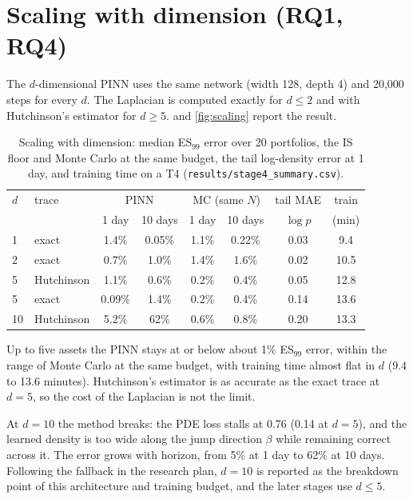 \section{Scaling with dimension (RQ1, RQ4)}
\label{sec:res-scaling}

The $d$-dimensional PINN uses the same network (width 128, depth 4) and 20{,}000 steps for every $d$. The
Laplacian is computed exactly for $d \le 2$ and with Hutchinson's estimator for $d \ge 5$.
 and \cref{fig:scaling} report the result.

\begin{table}[t]
  \centering
  \caption{Scaling with dimension: median ES$_{99}$ error over 20 portfolios, the IS floor and Monte Carlo
    at the same budget, the tail log-density error at 1 day, and training time on a T4
    (\texttt{results/stage4\_summary.csv}).}
  \label{tab:scaling}
  \begin{tabular}{llcccccc}
    \toprule
    $d$ & trace & \multicolumn{2}{c}{PINN} & \multicolumn{2}{c}{MC (same $N$)} & tail MAE & train \\
        &       & 1 day & 10 days & 1 day & 10 days & $\log p$ & (min) \\
    \midrule
    1  & exact      & 1.4\% & 0.05\% & 1.1\% & 0.22\% & 0.03 & 9.4 \\
    2  & exact      & 0.7\% & 1.0\%  & 1.4\% & 1.6\%  & 0.02 & 10.5 \\
    5  & Hutchinson & 1.1\% & 0.6\%  & 0.2\% & 0.4\%  & 0.05 & 12.8 \\
    5  & exact      & 0.09\% & 1.4\% & 0.2\% & 0.4\%  & 0.14 & 13.6 \\
    10 & Hutchinson & 5.2\% & 62\%   & 0.6\% & 0.8\%  & 0.20 & 13.3 \\
    \bottomrule
  \end{tabular}
\end{table}

Up to five assets the PINN stays at or below about 1\% ES$_{99}$ error, within the range of Monte Carlo at
the same budget, with training time almost flat in $d$ (9.4 to 13.6 minutes). Hutchinson's estimator is
as accurate as the exact trace at $d = 5$, so the cost of the Laplacian is not the limit.

At $d = 10$ the method breaks: the PDE loss stalls at 0.76 (0.14 at $d = 5$), and the learned density is
too wide along the jump direction $\beta$ while remaining correct across it. The error grows with horizon,
from 5\% at 1 day to 62\% at 10 days. Following the fallback in the research plan, $d = 10$ is reported as
the breakdown point of this architecture and training budget, and the later stages use $d \le 5$.

